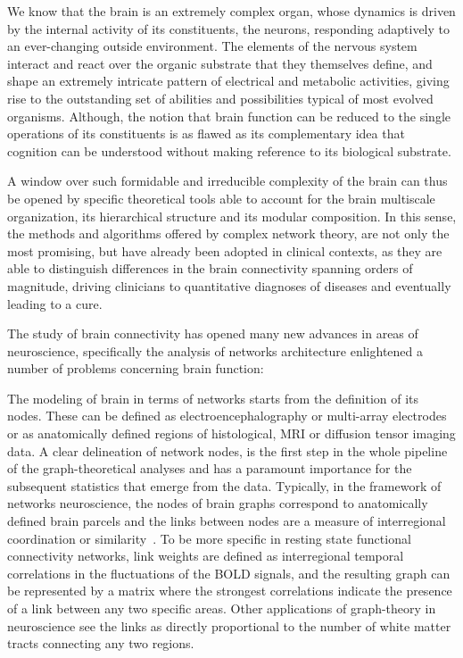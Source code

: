 We know that the brain is an extremely complex organ, whose dynamics is driven by the internal activity of its constituents, the neurons, responding adaptively to an ever-changing outside environment.
The elements of the nervous system interact and react over the organic substrate that they themselves define, and shape an extremely intricate pattern of electrical and metabolic activities, giving rise to the outstanding set of abilities and possibilities typical of most evolved organisms.
Although, the notion that brain function can be reduced to the single operations of its constituents is as flawed as its complementary idea that cognition can be understood without making reference to its biological substrate.

A window over such formidable and irreducible complexity of the brain can thus be opened by specific theoretical tools able to account for the brain multiscale organization, its hierarchical structure and its modular composition.
In this sense, the methods and algorithms offered by complex network theory, are not only the most promising, but have already been adopted in clinical contexts, as they are able to distinguish differences in the  brain connectivity spanning orders of magnitude, driving clinicians to quantitative diagnoses of diseases and eventually leading to a cure.


The study of brain connectivity has opened many new advances in areas of neuroscience, specifically the analysis of networks architecture enlightened a number of problems concerning brain function:


The modeling of brain in terms of networks starts from the definition of its nodes. These can be defined as electroencephalography or multi-array electrodes or as anatomically defined regions of histological, MRI or diffusion tensor imaging data. A clear delineation of network nodes, is the first step in the whole pipeline of the graph-theoretical analyses and has a paramount importance for the subsequent statistics that emerge from the data. Typically, in the framework of networks neuroscience, the nodes of brain graphs correspond to anatomically defined brain parcels and the links between nodes are a measure of interregional coordination or similarity~\cite{bullmore2009}. 
To be more specific in resting state functional connectivity networks, link weights are defined as interregional temporal correlations in the fluctuations of the BOLD signals, and the resulting graph can be represented by a matrix where the strongest correlations indicate the presence of a link between any two specific areas.
Other applications of graph-theory in neuroscience see the links as directly proportional to the number of white matter tracts connecting any two regions.

